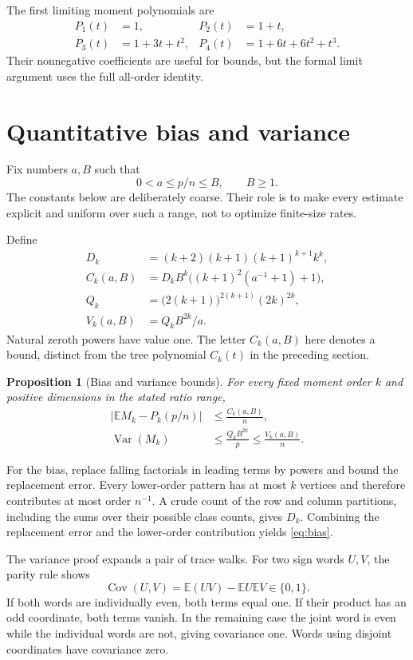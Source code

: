 \documentclass[11pt]{article}
\newtheorem{proposition}[theorem]{Proposition}
\theoremstyle{remark}
\newcommand{\E}{\mathbb E}
\newcommand{\Var}{\operatorname{Var}}
\begin{document}
The first limiting moment polynomials are
\begin{align*}
 P_1(t)&=1,&P_2(t)&=1+t,\\
 P_3(t)&=1+3t+t^2,&P_4(t)&=1+6t+6t^2+t^3.
\end{align*}
Their nonnegative coefficients are useful for bounds, but the formal limit argument uses the full all-order identity.

\section{Quantitative bias and variance}
Fix numbers $a,B$ such that
\[
 0<a\leq p/n\leq B,\qquad B\geq1.
\]
The constants below are deliberately coarse. Their role is to make every estimate explicit and uniform over such a range, not to optimize finite-size rates.

Define
\begin{align*}
 D_k&=(k+2)(k+1)(k+1)^{k+1}k^k,\\
 C_k(a,B)&=D_kB^k\bigl((k+1)^2(a^{-1}+1)+1\bigr),\\
 Q_k&=\bigl(2(k+1)\bigr)^{2(k+1)}(2k)^{2k},\\
 V_k(a,B)&=Q_kB^{2k}/a.
\end{align*}
Natural zeroth powers have value one. The letter $C_k(a,B)$ here denotes a bound, distinct from the tree polynomial $C_k(t)$ in the preceding section.

\begin{proposition}[Bias and variance bounds]\label{prop:bounds}
For every fixed moment order $k$ and positive dimensions in the stated ratio range,
\begin{align}
 \left|\E M_k-P_k(p/n)\right|&\leq \frac{C_k(a,B)}n,\label{eq:bias}\\
 \Var(M_k)&\leq\frac{Q_kB^{2k}}p\leq\frac{V_k(a,B)}n.\label{eq:variance}
\end{align}
\end{proposition}

For the bias, replace falling factorials in leading terms by powers and bound the replacement error. Every lower-order pattern has at most $k$ vertices and therefore contributes at most order $n^{-1}$. A crude count of the row and column partitions, including the sums over their possible class counts, gives $D_k$. Combining the replacement error and the lower-order contribution yields \eqref{eq:bias}.

The variance proof expands a pair of trace walks. For two sign words $U,V$, the parity rule shows
\[
 \operatorname{Cov}(U,V)=\E(UV)-\E U\E V\in\{0,1\}.
\]
If both words are individually even, both terms equal one. If their product has an odd coordinate, both terms vanish. In the remaining case the joint word is even while the individual words are not, giving covariance one. Words using disjoint coordinates have covariance zero.
\end{document}
